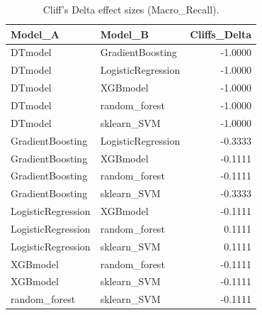 \begin{table}[t]
\centering
\begin{tabular}{llr}
\toprule
Model_A & Model_B & Cliffs_Delta \\
\midrule
DTmodel & GradientBoosting & -1.0000 \\
DTmodel & LogisticRegression & -1.0000 \\
DTmodel & XGBmodel & -1.0000 \\
DTmodel & random_forest & -1.0000 \\
DTmodel & sklearn_SVM & -1.0000 \\
GradientBoosting & LogisticRegression & -0.3333 \\
GradientBoosting & XGBmodel & -0.1111 \\
GradientBoosting & random_forest & -0.1111 \\
GradientBoosting & sklearn_SVM & -0.3333 \\
LogisticRegression & XGBmodel & -0.1111 \\
LogisticRegression & random_forest & 0.1111 \\
LogisticRegression & sklearn_SVM & 0.1111 \\
XGBmodel & random_forest & -0.1111 \\
XGBmodel & sklearn_SVM & -0.1111 \\
random_forest & sklearn_SVM & -0.1111 \\
\bottomrule
\end{tabular}
\caption{Cliff's Delta effect sizes (Macro_Recall).}
\label{tab:cliffs_Macro_Recall}
\end{table}